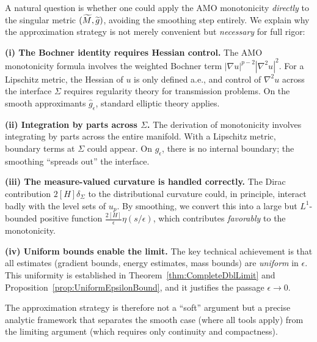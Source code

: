 \begin{remark}\label{rem:WhyApproximation}
A natural question is whether one could apply the AMO monotonicity \emph{directly} to the singular metric $(\widetilde{M}, \widetilde{g})$, avoiding the smoothing step entirely. We explain why the approximation strategy is not merely convenient but \emph{necessary} for full rigor:

\textbf{(i) The Bochner identity requires Hessian control.} The AMO monotonicity formula involves the weighted Bochner term $|\nabla u|^{p-2}|\nabla^2 u|^2$. For a Lipschitz metric, the Hessian of $u$ is only defined a.e., and control of $\nabla^2 u$ across the interface $\Sigma$ requires regularity theory for transmission problems. On the smooth approximants $\hat{g}_\epsilon$, standard elliptic theory applies.

\textbf{(ii) Integration by parts across $\Sigma$.} The derivation of monotonicity involves integrating by parts across the entire manifold. With a Lipschitz metric, boundary terms at $\Sigma$ could appear. On $\hat{g}_\epsilon$, there is no internal boundary; the smoothing ``spreads out'' the interface.

\textbf{(iii) The measure-valued curvature is handled correctly.} The Dirac contribution $2[H]\delta_\Sigma$ to the distributional curvature could, in principle, interact badly with the level sets of $u_p$. By smoothing, we convert this into a large but $L^1$-bounded positive function $\frac{2[H]}{\epsilon}\eta(s/\epsilon)$, which contributes \emph{favorably} to the monotonicity.

\textbf{(iv) Uniform bounds enable the limit.} The key technical achievement is that all estimates (gradient bounds, energy estimates, mass bounds) are \emph{uniform} in $\epsilon$. This uniformity is established in Theorem~\ref{thm:CompleteDblLimit} and Proposition~\ref{prop:UniformEpsilonBound}, and it justifies the passage $\epsilon \to 0$.

The approximation strategy is therefore not a ``soft'' argument but a precise analytic framework that separates the smooth case (where all tools apply) from the limiting argument (which requires only continuity and compactness).
\end{remark}

